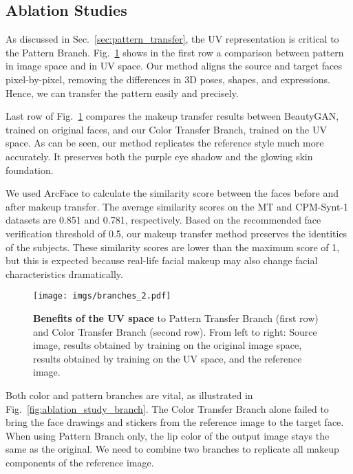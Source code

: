 \documentclass[final]{cvpr}
\newcommand{\Sref}[1]{Sec.~\ref{#1}}
\newcommand{\Fref}[1]{Fig.~\ref{#1}}
\begin{document}
\subsection{Ablation Studies}
\label{sec:ablation_studies}
\vspace{-2mm}
\label{sec:ablation_uv}
As discussed in \Sref{sec:pattern_transfer}, the UV representation is critical to the Pattern Branch. \Fref{fig:texture} shows in the first row a comparison between pattern in image space and in UV space. Our method aligns the source and target faces pixel-by-pixel, removing the differences in 3D poses, shapes, and expressions. Hence, we can transfer the pattern easily and precisely.

Last row of \Fref{fig:texture} compares the makeup transfer results between BeautyGAN, trained on original faces, and our Color Transfer Branch, trained on the UV space. As can be seen, our method replicates the reference style much more accurately. It preserves both the purple eye shadow and the glowing skin foundation.



  We used ArcFace \cite{deng2018arcface} to calculate the similarity score between the faces before and after makeup transfer. The average similarity scores on the MT and CPM-Synt-1 datasets are 0.851 and 0.781, respectively. Based on the recommended face verification threshold of 0.5, our makeup transfer method preserves the identities of the subjects. These similarity scores are lower than the maximum score of 1, but this is expected because real-life facial makeup may also change facial characteristics dramatically.

\begin{figure}
\centering 
\texttt{[image: imgs/branches\_2.pdf]}
\vskip -0.1in
\caption{{\bf Benefits of the UV space} to Pattern Transfer Branch (first row) and Color Transfer Branch (second row). From left to right: Source image, results obtained by training on the original image space, results obtained by training on the UV space, and the reference image.}
\label{fig:texture}
\vspace{-2mm}
\end{figure}




Both color and pattern branches are vital, as illustrated in  \Fref{fig:ablation_study_branch}. The Color Transfer Branch alone failed to bring the face drawings and stickers from the reference image to the target face. When using Pattern Branch only, the lip color of the output image stays the same as the original. We need to combine two branches to replicate all makeup components of the reference image.
\end{document}
